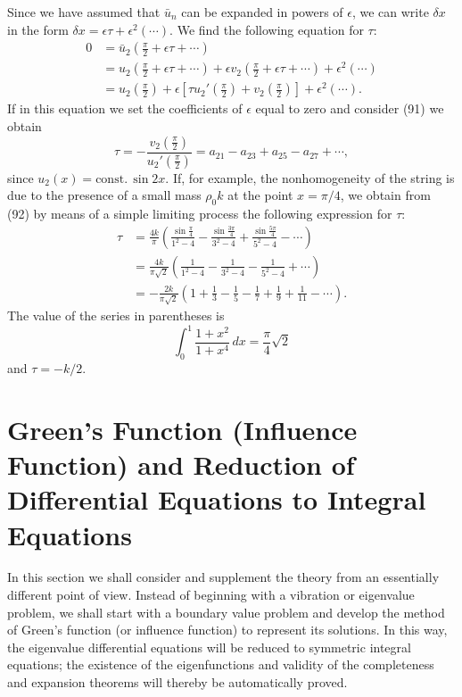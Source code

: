Since we have assumed that $\bar u_n$ can be expanded in powers of $\epsilon$, we can write $\delta x$ in the form $\delta x=\epsilon\tau+\epsilon^2(\cdots)$. We find the following equation for $\tau$:
\[
\begin{aligned}
0&=\bar u_2\left(\frac{\pi}{2}+\epsilon\tau+\cdots\right)\\
&=u_2\left(\frac{\pi}{2}+\epsilon\tau+\cdots\right)
 +\epsilon v_2\left(\frac{\pi}{2}+\epsilon\tau+\cdots\right)+\epsilon^2(\cdots)\\
&=u_2\left(\frac{\pi}{2}\right)
 +\epsilon\left[\tau u_2'\left(\frac{\pi}{2}\right)+v_2\left(\frac{\pi}{2}\right)\right]
 +\epsilon^2(\cdots).
\end{aligned}
\]
If in this equation we set the coefficients of $\epsilon$ equal to zero and consider (91) we obtain
\[
\tau=-\frac{v_2\left(\frac{\pi}{2}\right)}{u_2'\left(\frac{\pi}{2}\right)}
=a_{21}-a_{23}+a_{25}-a_{27}+\cdots,
\]
since $u_2(x)=\mathrm{const.}\,\sin 2x$. If, for example, the nonhomogeneity of the string is due to the presence of a small mass $\rho_0 k$ at the point $x=\pi/4$, we obtain from (92) by means of a simple limiting process the following expression for $\tau$:
\[
\begin{aligned}
\tau&=\frac{4k}{\pi}\left(
\frac{\sin\frac{\pi}{4}}{1^2-4}
-\frac{\sin\frac{3\pi}{4}}{3^2-4}
+\frac{\sin\frac{5\pi}{4}}{5^2-4}-\cdots\right)\\
&=\frac{4k}{\pi\sqrt2}\left(
\frac1{1^2-4}-\frac1{3^2-4}-\frac1{5^2-4}+\cdots\right)\\
&=-\frac{2k}{\pi\sqrt2}\left(1+\frac13-\frac15-\frac17+\frac19+\frac1{11}-\cdots\right).
\end{aligned}
\]
The value of the series in parentheses is
\[
\int_0^1\frac{1+x^2}{1+x^4}\,dx=\frac{\pi}{4}\sqrt2
\]
and $\tau=-k/2$.

\section{Green's Function (Influence Function) and Reduction of Differential Equations to Integral Equations}
In this section we shall consider and supplement the theory from an essentially different point of view. Instead of beginning with a vibration or eigenvalue problem, we shall start with a boundary value problem and develop the method of Green's function (or influence function) to represent its solutions. In this way, the eigenvalue differential equations will be reduced to symmetric integral equations; the existence of the eigenfunctions and validity of the completeness and expansion theorems will thereby be automatically proved.

